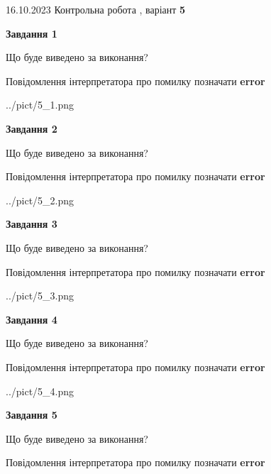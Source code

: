 \documentclass[12pt, ukrainian]{article}
\begin{document}
{\Large{16.10.2023 Контрольна робота , варіант  \No \textbf { 5 }\par}}
{
\begin {large}
{\begin {center}\textbf{Завдання 1}\end {center}}\par
Що буде виведено за виконання? \par
Повідомлення інтерпретатора про помилку позначати \textbf{error}

\begin{center}
	{../pict/5_1.png}
\end{center}
\newpage

{\begin {center}\textbf{Завдання 2}\end {center}}\par
Що буде виведено за виконання? \par
Повідомлення інтерпретатора про помилку позначати \textbf{error}

\begin{center}
	{../pict/5_2.png}
\end{center}
\newpage

{\begin {center}\textbf{Завдання 3}\end {center}}\par
Що буде виведено за виконання? \par
Повідомлення інтерпретатора про помилку позначати \textbf{error}

\begin{center}
	{../pict/5_3.png}
\end{center}
\newpage

{\begin {center}\textbf{Завдання 4}\end {center}}\par
Що буде виведено за виконання? \par
Повідомлення інтерпретатора про помилку позначати \textbf{error}

\begin{center}
	{../pict/5_4.png}
\end{center}
\newpage

{\begin {center}\textbf{Завдання 5}\end {center}}\par
Що буде виведено за виконання? \par
Повідомлення інтерпретатора про помилку позначати \textbf{error}


\end{large}}
\end{document}
